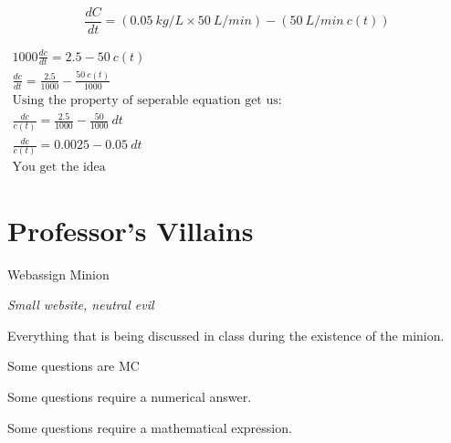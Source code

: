 \documentclass[letterpaper,10pt,twoside,twocolumn,openany]{book}
\begin{document}
$$
    \frac{dC}{dt} = (0.05\ kg/L \times 50\ L/min) - (50\ L/min\ c(t))
$$

$\begin{gathered}
    1000\frac{dc}{dt} = 2.5 - 50\ c(t)\\
    \frac{dc}{dt} = \frac{2.5}{1000} - \frac{50\ c(t)}{1000}\\
    \text{Using the property of seperable equation get us:}\\
    \frac{dc}{c(t)} = \frac{2.5}{1000} - \frac{50}{1000}\ dt\\
    \frac{dc}{c(t)} =  0.0025 - 0.05\ dt\\
    \text{You get the idea}
\end{gathered}$





\twocolumn


\chapter{Professor's Villains}
\begin{monsterbox}{Webassign Minion}
    \begin{hangingpar}
        \textit{Small website, neutral evil}
    \end{hangingpar}
    \dndline
    \basics[
        armorclass = Collectively 10,
        hitpoints = \dice{4d10 + 8},
        speed = {1 - 2 weeks}
        ]
        \dndline
        \stats[
        STR = \stat{7},
        DEX = \stat{15},
        CON = \stat{9},
        INT = \stat{8},
        WIS = \stat{7},
        CHA = \stat{8},
    ]
    \dndline
    \details[
        damagevulnerabilities = {Calculator, Wolfram Alpha, Google},
        languages = {Algebra, Integration, Derivative},
        challenge = {1/8},
    ]
    \dndline
    Everything that is being discussed in class during the existence of the minion.
    \begin{monsteraction}
        Some questions are MC
    \end{monsteraction}
    \begin{monsteraction}[Numerical]
        Some questions require a numerical answer.
    \end{monsteraction}    
    \begin{monsteraction}
        Some questions require a mathematical expression.
    \end{monsteraction}
\end{monsterbox}
\end{document}
